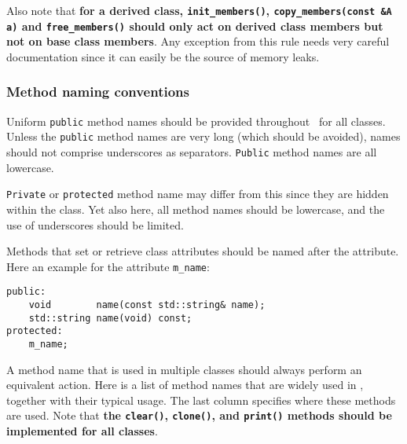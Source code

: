 \documentclass{article}[12pt,a4]
\begin{document}
Also note that {\bf for a derived class, {\tt init\_members()}, {\tt copy\_members(const \&A a)}
and {\tt free\_members()} should only act on derived class members but not on
base class members}.
Any exception from this rule needs very careful documentation since it can easily be
the source of memory leaks.


\subsubsection{Method naming conventions}

Uniform {\tt public} method names should be provided throughout \this\ for all classes.
Unless the {\tt public} method names are very long (which should be avoided), names
should not comprise underscores as separators.
{\tt Public} method names are all lowercase.

{\tt Private} or {\tt protected} method name may differ from this since they are hidden within 
the class.
Yet also here, all method names should be lowercase, and the use of underscores
should be limited.

Methods that set or retrieve class attributes should be named after the attribute.
Here an example for the attribute {\tt m\_name}:
\begin{verbatim}
public:
    void        name(const std::string& name);
    std::string name(void) const;
protected:
    m_name;
\end{verbatim}

A method name that is used in multiple classes should always perform an equivalent action.
Here is a list of method names that are widely used in \this, together with their typical usage.
The last column specifies where these methods are used.
Note that {\bf the {\tt clear()}, {\tt clone()}, and {\tt print()} methods should be implemented for all 
classes}.
\end{document}
